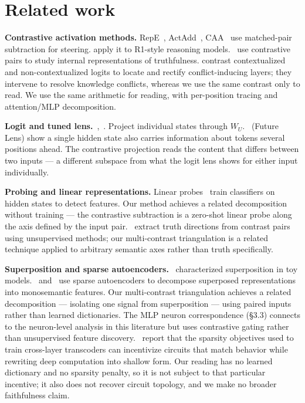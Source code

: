 \documentclass[11pt]{article}
\newcommand{\WU}{W_U}
\begin{document}
\section{Related work}

\textbf{Contrastive activation methods.} RepE~\citep{zou2023}, ActAdd~\citep{turner2023},
CAA~\citep{rimsky2024} use matched-pair subtraction for steering.
\citet{du2026} apply it to R1-style reasoning models.~\citet{li2024}
use contrastive pairs to study internal representations of truthfulness.
\citet{ma2026} contrast contextualized and non-contextualized logits to
locate and rectify conflict-inducing layers; they intervene to resolve
knowledge conflicts, whereas we use the same contrast only to read.
We use the same arithmetic for reading, with per-position tracing and
attention/MLP decomposition.

\textbf{Logit and tuned lens.}~\citet{nostalgebraist2020},~\citet{belrose2023}. Project
individual states through $\WU$.~\citet{pal2023} (Future Lens) show a single
hidden state also carries information about tokens several positions ahead.
The contrastive projection reads the content
that differs between two inputs --- a different subspace from what the logit lens
shows for either input individually.

\textbf{Probing and linear representations.} Linear probes~\citep{belinkov2022} train
classifiers on hidden states to detect features. Our method achieves a
related decomposition without training --- the contrastive subtraction is a
zero-shot linear probe along the axis defined by the input pair.~\citet{burns2023}
extract truth directions from contrast pairs using unsupervised
methods; our multi-contrast triangulation is a related technique applied to
arbitrary semantic axes rather than truth specifically.

\textbf{Superposition and sparse autoencoders.}~\citet{elhage2022} characterized
superposition in toy models.~\citet{bricken2023} and~\citet{templeton2024}
use sparse autoencoders to decompose superposed representations into
monosemantic features. Our multi-contrast triangulation achieves a related
decomposition --- isolating one signal from superposition --- using paired inputs
rather than learned dictionaries. The MLP neuron correspondence (\S3.3) connects
to the neuron-level analysis in this literature but uses contrastive gating
rather than unsupervised feature discovery.~\citet{lange2026} report that the
sparsity objectives used to train cross-layer transcoders can incentivize
circuits that match behavior while rewriting deep computation into shallow
form. Our reading has no learned dictionary and no sparsity penalty, so it is
not subject to that particular incentive; it also does not recover circuit
topology, and we make no broader faithfulness claim.
\end{document}
